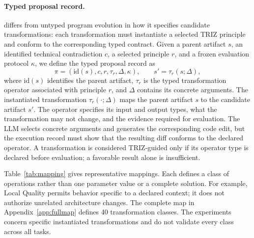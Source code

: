 \documentclass[manuscript,screen,nonacm]{acmart}
\begin{document}
\paragraph{Typed proposal record.}
\triza{} differs from untyped program evolution in how it specifies
candidate transformations: each transformation must instantiate a
selected TRIZ principle and conform to the corresponding typed contract. Given a parent artifact $s$, an identified technical contradiction $c$, a selected principle $r$, and a frozen evaluation protocol $\kappa$, we define the typed proposal record as
\begin{equation}
    \pi=(\mathrm{id}(s),c,r,\tau_r,\Delta,\kappa),
    \qquad
    s'=\tau_r(s;\Delta),
    \label{eq:proposal}
\end{equation}
where $\mathrm{id}(s)$ identifies the parent artifact, $\tau_r$ is the typed transformation operator associated with
principle $r$, and $\Delta$ contains its concrete arguments. The
instantiated transformation $\tau_r(\cdot;\Delta)$ maps the parent
artifact $s$ to the candidate artifact $s'$. The operator specifies its input and output types, what the transformation may not change, and the evidence required for evaluation. The LLM selects concrete arguments and generates the corresponding code edit, but the execution record must show that the resulting diff conforms to the declared operator. A transformation is considered TRIZ-guided only if its operator type is declared before evaluation; a favorable result alone is insufficient.

Table~\ref{tab:mapping} gives representative mappings. Each defines a class of operations rather than one parameter value or a complete solution. For example, Local Quality permits behavior specific to a declared context; it does not authorize unrelated architecture changes. The complete map in Appendix~\ref{app:fullmap} defines 40 transformation classes. The experiments concern specific instantiated transformations and do not validate every class across all tasks.
\end{document}
